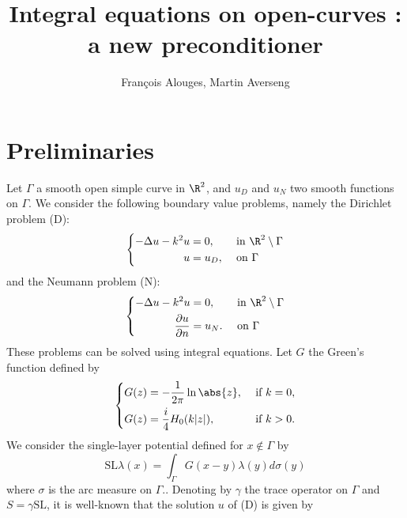 \documentclass[]{article}
\author{François Alouges, Martin Averseng}
\title{Integral equations on open-curves : a new preconditioner}
\begin{document}
\maketitle



\section{Preliminaries}
Let $\Gamma$ a smooth open simple curve in $\R^2$, and $u_D$ and $u_N$ two smooth functions on $\Gamma$. We consider the following boundary value problems, namely the Dirichlet problem (D):  
\begin{equation*}
\left \{
\begin{aligned}
-\Delta u - k^2 u &= 0, && \text{ in } \R^2 \setminus \Gamma \\
u &= u_D, && \text{ on } \Gamma
\end{aligned} \right.
\end{equation*}
and the Neumann problem (N): 
\begin{equation*}
\left \{
\begin{aligned}
-\Delta u - k^2 u &= 0, && \text{ in } \R^2 \setminus \Gamma \\
\dfrac{\partial u}{\partial n} &= u_N. && \text{ on } \Gamma
\end{aligned} \right.
\end{equation*} 
These problems can be solved using integral equations. Let $G$ the Green's function defined by 
\begin{equation}
\left \{
\begin{aligned}
G(z) &= -\dfrac{1}{2\pi} \ln \abs{z}, && \text{ if } k= 0,\\
G(z) &= \frac{i}{4}H_0(k|z|), && \text{ if } k > 0.
\end{aligned} \right.
\end{equation} 
We consider the single-layer potential defined for $x \notin \Gamma$ by 
\begin{equation}
	\text{SL}\lambda(x) = \int_{\Gamma}G(x-y)\lambda(y)d\sigma(y)
\end{equation}
where $\sigma$ is the arc measure on $\Gamma$.. Denoting by $\gamma$ the trace operator on $\Gamma$ and $S = \gamma \text{SL}$, it is well-known that the solution $u$ of (D) is given by 
\end{document}
